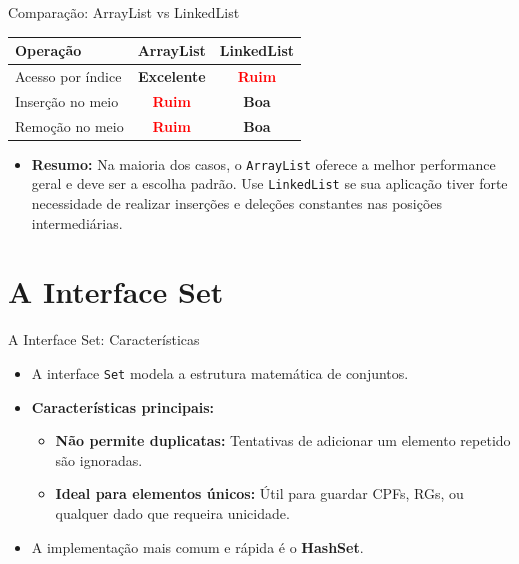 \documentclass[9pt]{beamer}
\begin{document}
\begin{frame}{Comparação: ArrayList vs LinkedList}
    \begin{center}
        \renewcommand{\arraystretch}{1.5}
        \begin{tabular}{|l|c|c|}
        \hline
        \textbf{Operação} & \textbf{ArrayList} & \textbf{LinkedList} \\ \hline
        Acesso por índice & \textcolor{codegreen}{\textbf{Excelente}} & \textcolor{red}{\textbf{Ruim}} \\ \hline
        Inserção no meio  & \textcolor{red}{\textbf{Ruim}} & \textcolor{codegreen}{\textbf{Boa}} \\ \hline
        Remoção no meio   & \textcolor{red}{\textbf{Ruim}} & \textcolor{codegreen}{\textbf{Boa}} \\ \hline
        \end{tabular}
    \end{center}
    
    \vspace{0.5cm}
    \begin{itemize}
        \item \textbf{Resumo:} Na maioria dos casos, o \texttt{ArrayList} oferece a melhor performance geral e deve ser a escolha padrão. Use \texttt{LinkedList} se sua aplicação tiver forte necessidade de realizar inserções e deleções constantes nas posições intermediárias.
    \end{itemize}
\end{frame}

\section{A Interface Set}

\begin{frame}{A Interface Set: Características}
    \begin{itemize}
        \item A interface \texttt{Set} modela a estrutura matemática de conjuntos.
        \item \textbf{Características principais:}
        \begin{itemize}
            \item \textbf{Não permite duplicatas:} Tentativas de adicionar um elemento repetido são ignoradas.
            \item \textbf{Ideal para elementos únicos:} Útil para guardar CPFs, RGs, ou qualquer dado que requeira unicidade.
        \end{itemize}
        \item A implementação mais comum e rápida é o \textbf{HashSet}.
    \end{itemize}
\end{frame}
\end{document}

